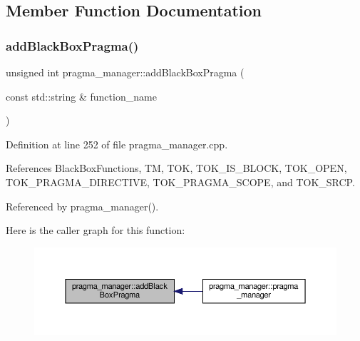 \subsection{Member Function Documentation}
\mbox{\label{classpragma__manager_a5f0bcf90f2232b3dcff39dc3daa5d3b6}} 
\subsubsection{\texorpdfstring{add\+Black\+Box\+Pragma()}{addBlackBoxPragma()}}
{\footnotesize\ttfamily unsigned int pragma\+\_\+manager\+::add\+Black\+Box\+Pragma (\begin{DoxyParamCaption}\item[{const std\+::string \&}]{function\+\_\+name }\end{DoxyParamCaption})}



Definition at line 252 of file pragma\+\_\+manager.\+cpp.



References Black\+Box\+Functions, TM, T\+OK, T\+O\+K\+\_\+\+I\+S\+\_\+\+B\+L\+O\+CK, T\+O\+K\+\_\+\+O\+P\+EN, T\+O\+K\+\_\+\+P\+R\+A\+G\+M\+A\+\_\+\+D\+I\+R\+E\+C\+T\+I\+VE, T\+O\+K\+\_\+\+P\+R\+A\+G\+M\+A\+\_\+\+S\+C\+O\+PE, and T\+O\+K\+\_\+\+S\+R\+CP.



Referenced by pragma\+\_\+manager().

Here is the caller graph for this function\+:
\nopagebreak
\begin{figure}[H]
\begin{center}
\leavevmode
\includegraphics[width=350pt]{d2/d1d/classpragma__manager_a5f0bcf90f2232b3dcff39dc3daa5d3b6_icgraph}
\end{center}
\end{figure}
\mbox{\label{classpragma__manager_a420b9692559523899f4af05afed3fd15}} 
